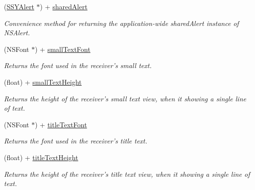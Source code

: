 \begin{CompactItemize}
(\hyperlink{interface_s_s_y_alert}{SSYAlert} $\ast$) + \hyperlink{interface_s_s_y_alert_d81f6d234a6bbe8a7181c739f0b6ef2e}{sharedAlert}
\begin{CompactList}\small\item\em Convenience method for returning the application-wide sharedAlert instance of NSAlert. \item\end{CompactList}\item 
(NSFont $\ast$) + \hyperlink{interface_s_s_y_alert_7235377dad1e98bade605b665770f056}{smallTextFont}
\begin{CompactList}\small\item\em Returns the font used in the receiver's small text. \item\end{CompactList}\item 
(float) + \hyperlink{interface_s_s_y_alert_7e4e69784b95d9fa49cbc8dc12fc2e0e}{smallTextHeight}
\begin{CompactList}\small\item\em Returns the height of the receiver's small text view, when it showing a single line of text. \item\end{CompactList}\item 
(NSFont $\ast$) + \hyperlink{interface_s_s_y_alert_203afc0936f3aa64eb7ac373644902b2}{titleTextFont}
\begin{CompactList}\small\item\em Returns the font used in the receiver's title text. \item\end{CompactList}\item 
(float) + \hyperlink{interface_s_s_y_alert_1b78c67ac1fbc0cd72bee1875f49fa3a}{titleTextHeight}
\begin{CompactList}\small\item\em Returns the height of the receiver's title text view, when it showing a single line of text. \item\end{CompactList}\end{CompactItemize}
